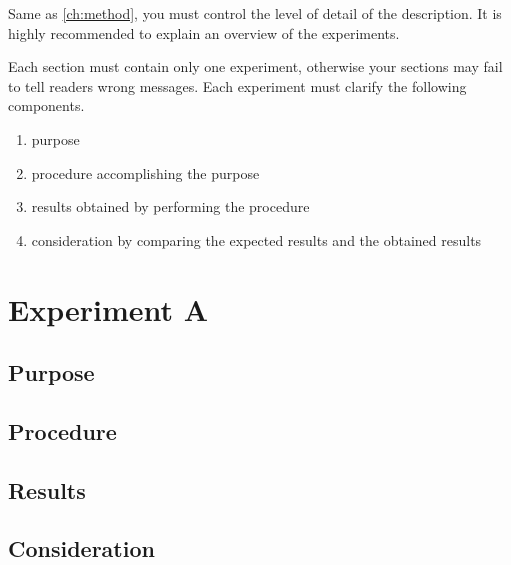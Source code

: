 ﻿Same as \cref{ch:method}, you must control the level of detail of the description.
It is highly recommended to explain an overview of the experiments.

\par
Each section must contain only one experiment, otherwise your sections may fail to tell readers wrong messages.
Each experiment must clarify the following components.
\begin{enumerate}
	\item purpose
	\item procedure accomplishing the purpose
	\item results obtained by performing the procedure
	\item consideration by comparing the expected results and the obtained results
\end{enumerate}

\section{Experiment A}

\subsection{Purpose}

\subsection{Procedure}

\subsection{Results}

\subsection{Consideration}